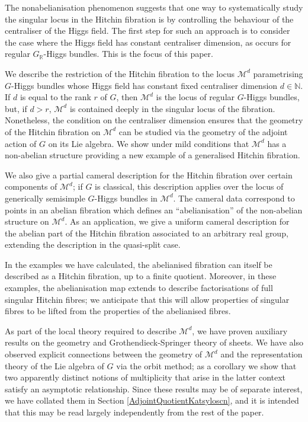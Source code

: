 \documentclass{amsart}
\theoremstyle{remark}
\numberwithin{theorem}{section}
\numberwithin{equation}{section}
\begin{document}
The nonabelianisation phenomenon suggests that one way to systematically study the singular locus in the Hitchin fibration is by controlling the behaviour of the centraliser of the Higgs field. The first step for such an approach is to consider the case where the Higgs field has constant centraliser dimension, as occurs for regular $G_\mathbb{R}$-Higgs bundles. This is the focus of this paper.

We describe the restriction of the Hitchin fibration to the locus $\mathcal M^d$ parametrising $G$-Higgs bundles whose Higgs field has constant fixed centraliser dimension $d \in \mathbb{N}$. If $d$ is equal to the rank $r$ of $G$, then $\mathcal M^d$ is the locus of regular $G$-Higgs bundles, but, if $d> r$, $\mathcal M^d$ is contained deeply in the singular locus of the fibration. Nonetheless, the condition on the centraliser dimension ensures that the geometry of the Hitchin fibration on $\mathcal M^d$ can be studied via the geometry of the adjoint action of $G$ on its Lie algebra. We show under mild conditions that $\mathcal M^d$ has a non-abelian structure providing a new example of a generalised Hitchin fibration.

We also give a partial cameral description for the Hitchin fibration over certain components of $\mathcal M^d$; if $G$ is classical, this description applies over the locus of generically semisimple $G$-Higgs bundles in $\mathcal M^d$. The cameral data correspond to points in an abelian fibration which defines an ``abelianisation'' of the non-abelian structure on $\mathcal M^d$. As an application, we give a uniform cameral description for the abelian part of the Hitchin fibration associated to an arbitrary real group, extending the description in the quasi-split case.

In the examples we have calculated, the abelianised fibration can itself be described as a Hitchin fibration, up to a finite quotient. Moreover, in these examples, the abelianisation map extends to describe factorisations of full singular Hitchin fibres; we anticipate that this will allow properties of singular fibres to be lifted from the properties of the abelianised fibres.

As part of the local theory required to describe $\mathcal M^d$, we have proven auxiliary results on the geometry and Grothendieck-Springer theory of sheets. We have also observed explicit connections between the geometry of $\mathcal M^d$ and the representation theory of the Lie algebra of $G$ via the orbit method; as a corollary we show that two apparently distinct notions of multiplicity that arise in the latter context satisfy an asymptotic relationship. Since these results may be of separate interest, we have collated them in Section \ref{AdjointQuotientKatsyloscn}, and it is intended that this may be read largely independently from the rest of the paper.
\end{document}
